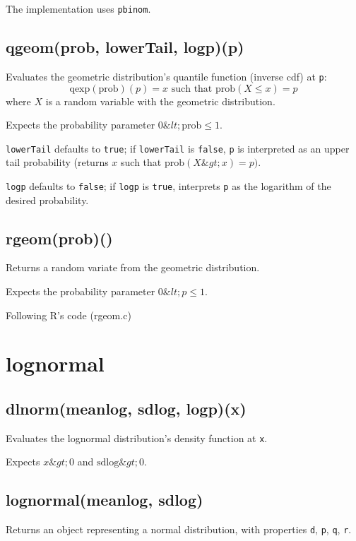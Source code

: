 \documentclass{article}
\begin{document}
The implementation uses \texttt{pbinom}.


    \subsection*{qgeom(prob, lowerTail, logp)(p)}
    Evaluates the geometric distribution's quantile function
(inverse cdf) at \texttt{p}:
$$\textrm{qexp}(\textrm{prob})(p) = x \textrm{ such that } \textrm{prob}(X \leq x) = p$$
where $X$ is a random variable with the geometric distribution.


Expects the probability parameter $0 \&lt; \textrm{prob} \leq 1$.


\texttt{lowerTail} defaults to \texttt{true}; if \texttt{lowerTail} is \texttt{false}, \texttt{p} is
interpreted as an upper tail probability (returns
$x$ such that $\textrm{prob}(X \&gt; x) = p)$.


\texttt{logp} defaults to \texttt{false}; if \texttt{logp} is \texttt{true}, interprets \texttt{p} as
the logarithm of the desired probability.


    \subsection*{rgeom(prob)()}
    Returns a random variate from the geometric distribution.


Expects the probability parameter $0 \&lt; p \leq 1$.


Following R's code (rgeom.c)


  \section{lognormal}
    \subsection*{dlnorm(meanlog, sdlog, logp)(x)}
    Evaluates the lognormal distribution's density function at \texttt{x}.


Expects $x \&gt; 0$ and $\textrm{sdlog} \&gt; 0$.


    \subsection*{lognormal(meanlog, sdlog)}
    Returns an object representing a normal distribution, with properties \texttt{d}, \texttt{p}, \texttt{q}, \texttt{r}.
\end{document}

